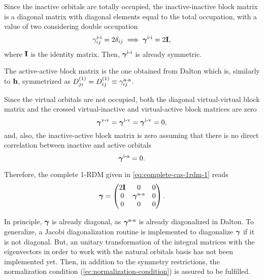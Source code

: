 Since the inactive orbitals are totally occupied, the inactive-inactive block
matrix is a diagonal matrix with diagonal elements equal to the total occupation,
with a value of two considering double occupation
\begin{equation}
         \gamma_{ij}^{\text{i-i}} = 2\delta_{ij}
         \implies
         \boldsymbol{\mathrm{\gamma}}^{\text{i-i}} = 2\boldsymbol{\mathrm{I}}
         ,
\end{equation}
where $ \boldsymbol{\mathrm{I}}$ is the identity matrix.
Then, $ \boldsymbol{\mathrm{\gamma}}^{\text{i-i}}$ is already symmetric.

The active-active block matrix is the one obtained from Dalton which is,
similarly to $\boldsymbol{\mathrm{h}}$, symmetrized as 
$D^{\left( 1 \right)}_{ji} = D^{\left( 1 \right)}_{ij} \equiv \gamma_{ij}^{\text{a-a}}$.

Since the virtual orbitals are not occupied, both the diagonal virtual-virtual
block matrix and the crossed virtual-inactive and virtual-active block
matrices are zero 
\begin{equation}
    \boldsymbol{\mathrm{\gamma}}^{\text{v-v}} =
    \boldsymbol{\mathrm{\gamma}}^{\text{i-v}} =
    \boldsymbol{\mathrm{\gamma}}^{\text{i-v}} = 0
    ,
\end{equation}
and, also, the inactive-active block matrix is zero assuming that there is no
direct correlation between inactive and active orbitals 
\begin{equation}
    \boldsymbol{\mathrm{\gamma}}^{\text{i-a}} = 0.
\end{equation}

Therefore, the complete 1-RDM given in \cref{eq:complete-cas-1rdm-1} reads
\begin{equation} \label{eq:complete-cas-1rdm-2}
    \boldsymbol{\mathrm{\gamma}} =
    \begin{pmatrix}
        2\boldsymbol{\mathrm{I}} & 0 & 0 \\
        0 & \boldsymbol{\mathrm{\gamma}}^{\text{a-a}} & 0 \\
        0 & 0 & 0 \\
    \end{pmatrix}
    .
\end{equation}

In principle, $ \boldsymbol{\mathrm{\gamma}}$ is already diagonal, as $ \boldsymbol{\mathrm{\gamma}}^{\text{a-a}}$
is already diagonalized in Dalton.
To generalize, a Jacobi diagonalization routine is implemented to diagonalize
$ \boldsymbol{\mathrm{\gamma}}$ if it is not diagonal. 
But, an unitary transformation of the integral matrices with the eigenvectors
in order to work with the natural orbitals basis has not been implemented yet.
Then, in addition to the symmetry restrictions, the normalization condition
(\cref{ec:normalization-condition}) is assured to be fulfilled.

